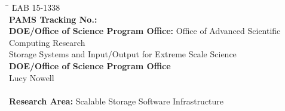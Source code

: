 \bigskip

\begin{tabbing}
\hspace*{10mm} \=  \= LAB 15-1338\\
\> \textbf{PAMS Tracking No.:}			    \\
\> \textbf{DOE/Office of Science Program Office:} \> Office of Advanced Scientific Computing Research\\
\>									    \> Storage Systems and Input/Output for Extreme Scale Science\\
\> \textbf{DOE/Office of Science Program Office}  \> \\
\>  \>  Lucy Nowell\\
\\
\> \textbf{Research Area:} \>Scalable Storage Software Infrastructure

\end{tabbing}




\newpage